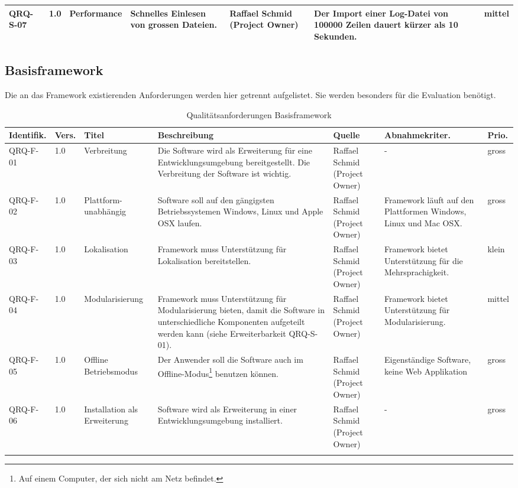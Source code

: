 \begin{landscape}
\begin{longtable}{|p{1.6cm}|p{0.7cm}|p{2.5cm}|p{4.5cm}|p{2.6cm}|p{4cm}|p{0.9cm}|}
   QRQ-S-07 & 1.0 & Performance & Schnelles Einlesen von grossen Dateien. & Raffael Schmid (Project Owner) & Der Import einer Log-Datei von 100000 Zeilen dauert kürzer als 10 Sekunden.&mittel \\\hline

\end{longtable}
\subsection{Basisframework}\label{anforderungen_framework}
Die an das Framework existierenden Anforderungen werden hier getrennt aufgelistet. Sie werden besonders für die Evaluation benötigt.

\begin{longtable}{|p{1.6cm}|p{0.7cm}|p{2.5cm}|p{4.5cm}|p{2.6cm}|p{4cm}|p{0.9cm}|}
    \hline\textbf{Identifik.} & \textbf{Vers.}& \textbf{Titel} & \textbf{Beschreibung} & \textbf{Quelle} & \textbf{Abnahmekriter.} & \textbf{Prio.}\\\hline
   QRQ-F-01 & 1.0 & Verbreitung & Die Software wird als Erweiterung für eine Entwicklungsumgebung bereitgestellt. Die Verbreitung der Software ist wichtig. & Raffael Schmid (Project Owner) & - & gross \\\hline

   QRQ-F-02 & 1.0 & Plattform-unabhängig & Software soll auf den gängigsten Betriebssystemen Windows, Linux und Apple OSX laufen. & Raffael Schmid (Project Owner) &  Framework läuft auf den Plattformen Windows, Linux und Mac OSX. & gross \\\hline

   QRQ-F-03 & 1.0 & Lokalisation & Framework muss Unterstützung für Lokalisation bereitstellen.& Raffael Schmid (Project Owner) & Framework bietet Unterstützung für die Mehrsprachigkeit. &klein \\\hline

   QRQ-F-04 & 1.0 & Modularisierung & Framework muss Unterstützung für Modularisierung bieten, damit die Software in unterschiedliche Komponenten aufgeteilt werden kann (siehe Erweiterbarkeit QRQ-S-01). & Raffael Schmid (Project Owner) & Framework bietet Unterstützung für Modularisierung.&mittel \\\hline

   QRQ-F-05 & 1.0 & Offline Betriebsmodus & Der Anwender soll die Software auch im Offline-Modus\footnote{Auf einem Computer, der sich nicht am Netz befindet.} benutzen können. & Raffael Schmid (Project Owner) & Eigenständige Software, keine Web Applikation & gross  \\\hline

   QRQ-F-06 & 1.0 & Installation als Erweiterung& Software wird als Erweiterung in einer Entwicklungsumgebung installiert. & Raffael Schmid (Project Owner) & - & gross  \\\hline
    \caption{Qualitätsanforderungen Basisframework}
\end{longtable}
\end{landscape}
